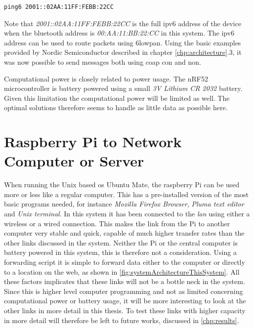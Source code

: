 \begin{verbatim}
ping6 2001::02AA:11FF:FEBB:22CC
\end{verbatim}


\noindent Note that \textit{2001::02AA:11FF:FEBB:22CC} is the full \gls{ipv6} address of the device when the bluetooth address is \textit{00:AA:11:BB:22:CC} in this system. The \gls{ipv6} address can be used to route packets using \gls{6lowpan}. Using the basic examples provided by Nordic Semiconductor described in chapter \ref{chp:architecture}.3, it was now possible to send messages both using \gls{coap} \gls{con} and \gls{non}.  

\noindent Computational power is closely related to power usage. The nRF52 microcontroller is battery powered using a small \textit{3V Lithium CR 2032} battery. Given this limitation the computational power will be limited as well. The optimal solutions therefore seems to handle as little data as possible here. 

\section{Raspberry Pi to Network Computer or Server}

\noindent When running the Unix based \gls{os} Ubuntu Mate, the raspberry Pi can be used more or less like a regular computer. This has a pre-installed version of the most basic programs needed, for instance \textit{Mozilla Firefox Browser}, \textit{Pluma text editor} and \textit{Unix terminal}. In this system it has been connected to the \textit{lan} using either a wireless or a wired connection. This makes the link from the Pi to another computer very stable and quick, capable of much higher transfer rates than the other links discussed in the system. Neither the Pi or the central computer is battery powered in this system, this is therefore not a consideration. Using a forwarding script it is simple to forward data either to the computer or directly to a location on the web, as shown in \ref{fig:systemArchitectureThisSystem}. All these factors implicates that these links will not be a bottle neck in the system. Since this is higher level computer programming and not as limited concerning computational power or battery usage, it will be more interesting to look at the other links in more detail in this thesis. To test these links with higher capacity in more detail will therefore be left to future works, discussed in \ref{chp:results}. 

\newpage

